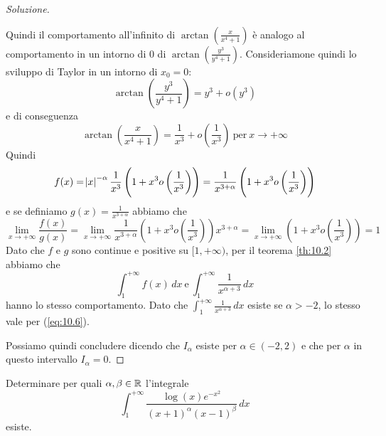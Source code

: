 \begin{proof}[Soluzione]
\begin{enumerate}[(i)]
\[        \]
        Quindi il comportamento all'infinito di $\arctan\left(\frac{x}{x^4+1}\right)$ è analogo al comportamento in un intorno di $0$ di $\arctan\left(\frac{y^3}{y^4+1}\right)$. Consideriamone quindi lo sviluppo di Taylor in un intorno di $x_0=0$:
        \[
        \arctan\left(\frac{y^3}{y^4+1}\right) = y^3 + o(y^3)
        \]
        e di conseguenza 
        \[
        \arctan\left(\frac{x}{x^4+1}\right) = \frac{1}{x^3}+o\left(\frac{1}{x^3}\right) \ \text{per} \ x\to +\infty
        \]
        Quindi
        \[
        f(x) = \abs{x}^{-\alpha}\frac{1}{x^3}\left(1+x^3o\left(\frac{1}{x^3}\right)\right) = \frac{1}{x^{3+\alpha}}\left(1+x^3o\left(\frac{1}{x^3}\right)\right)
        \]
        e se definiamo $g(x) = \frac{1}{x^{3+\alpha}}$ abbiamo che
        \[
        \lim_{x\to +\infty} \frac{f(x)}{g(x)} = \lim_{x\to+\infty}\frac{1}{x^{3+\alpha}}\left(1+x^3o\left(\frac{1}{x^3}\right)\right) x^{3+\alpha} = \lim_{x\to+\infty} \left(1+x^3o\left(\frac{1}{x^3}\right)\right) = 1
        \]
        Dato che $f$ e $g$ sono continue e positive su $[1, +\infty)$, per il teorema \ref{th:10.2} abbiamo che
        \[
        \int_1^{+\infty} f(x)\, dx \ \text{e} \ \int_1^{+\infty} \frac{1}{x^{\alpha+3}}\, dx
        \]
        hanno lo stesso comportamento. Dato che $\int_1^{+\infty}\frac{1}{x^{\alpha+3}}\, dx$ esiste se $\alpha>-2$, lo stesso vale per (\ref{eq:10.6}).
    \end{enumerate}
    Possiamo quindi concludere dicendo che $I_\alpha$ esiste per $\alpha\in(-2,2)$ e che per $\alpha$ in questo intervallo $I_\alpha = 0$.
\end{proof}
\begin{exercise}
    \label{ex:10.5}
    Determinare per quali $\alpha, \beta\in\amsbb{R}$ l'integrale
    \[
    \int_1^{+\infty} \frac{\log(x)e^{-x^2}}{(x+1)^\alpha(x-1)^\beta}\, dx
    \]
    esiste.
\end{exercise}
